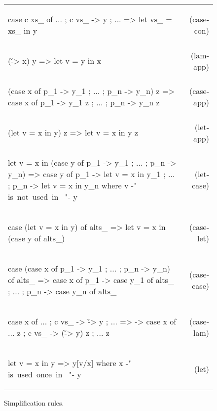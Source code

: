 \begin{figure}
\renewcommand{\f}[2]{\vspace{-7mm} #2 & (#1) \\}

\begin{flushright}
\begin{tabular}{p{8cm}r}
\f{case-con}{
\begin{code}
case c xs_ of {... ; c vs_ -> y ; ...}
    => let vs_ = xs_ in y
\end{code}}

\f{lam-app}{
\begin{code}
(\v -> x) y
    => let v = y in x
\end{code}}

\f{case-app}{
\begin{code}
(case x of {p_1 -> y_1 ; ... ; p_n -> y_n}) z
    => case x of {p_1 -> y_1 z ; ... ; p_n -> y_n z}
\end{code}}

\f{let-app}{
\begin{code}
(let v = x in y) z
    => let v = x in y z
\end{code}}

\f{let-case}{
\begin{code}
let v = x in (case y of {p_1 -> y_1 ; ... ; p_n -> y_n})
    => case y of  {  p_1  -> let v = x in y_1
                  ;  ...
                  ;  p_n  -> let v = x in y_n}
    where v {-" \hbox{is not used in } "-} y
\end{code}}

\f{case-let}{
\ignore\begin{code}
case (let v = x in y) of alts_
    => let v = x in (case y of alts_)
\end{code}}

\f{case-case}{
\begin{code}
case (case x of {p_1 -> y_1 ; ... ; p_n -> y_n}) of alts_
    => case x of  {  p_1  -> case y_1 of alts_
                  ;  ...
                  ;  p_n  -> case y_n of alts_ }
\end{code}}

\f{case-lam}{
\begin{code}
case x of {... ; c vs_ -> \v -> y ; ...}
    => \z -> case  x of
                   {... z ; c vs_ -> (\v -> y) z ; ... z}
\end{code}}

\f{let}{
\begin{code}
let v = x in y
    => y[v/x]
    where x {-" \hbox{is used once in } "-} y
\end{code}}
\end{tabular}
\end{flushright}
\caption{Simplification rules.}
\label{fig:simplify}
\end{figure}

